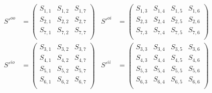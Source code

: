 \begin{equation}
    \begin{aligned}
    S'^{oo}
    &=
    \begin{pmatrix}
        S_{1,1} & S_{1,2} & S_{1,7} \\
        S_{2,1} & S_{2,2} & S_{2,7} \\
        S_{7,1} & S_{7,2} & S_{7,7} \\
    \end{pmatrix}
    &
    S'^{oi}
    &=
    \begin{pmatrix}
        S_{1,3} & S_{1,4} & S_{1,5} & S_{1,6} \\
        S_{2,3} & S_{2,4} & S_{2,5} & S_{2,6} \\
        S_{7,3} & S_{7,4} & S_{7,5} & S_{7,6} \\
    \end{pmatrix}
    \\
    S'^{io}
    &=
    \begin{pmatrix}
        S_{3,1} & S_{3,2} & S_{3,7} \\
        S_{4,1} & S_{4,2} & S_{4,7} \\
        S_{5,1} & S_{5,2} & S_{5,7} \\
        S_{6,1} & S_{6,2} & S_{6,7} \\
    \end{pmatrix}
    &
    S'^{ii}
    &=
    \begin{pmatrix}
        S_{3,3} & S_{3,4} & S_{3,5} & S_{3,6} \\
        S_{4,3} & S_{4,4} & S_{4,5} & S_{4,6} \\
        S_{5,3} & S_{5,4} & S_{5,5} & S_{5,6} \\
        S_{6,3} & S_{6,4} & S_{6,5} & S_{6,6} \\
    \end{pmatrix}
    \end{aligned}
    \label{eq:q_s_qtranspose_sprime_decomposed}
\end{equation}
